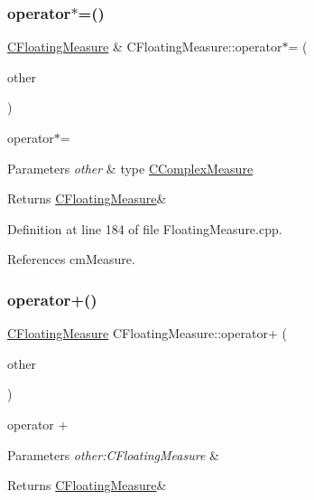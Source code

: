 \subsubsection{\texorpdfstring{operator$\ast$=()}{operator*=()}\hspace{0.1cm}{\footnotesize\ttfamily [3/3]}}
{\footnotesize\ttfamily \hyperlink{classCFloatingMeasure}{C\+Floating\+Measure} \& C\+Floating\+Measure\+::operator$\ast$= (\begin{DoxyParamCaption}\item[{const \hyperlink{classCComplexMeasure}{C\+Complex\+Measure} \&}]{other }\end{DoxyParamCaption})}



operator$\ast$= 


\begin{DoxyParams}{Parameters}
{\em other} & type \hyperlink{classCComplexMeasure}{C\+Complex\+Measure} \\
\hline
\end{DoxyParams}
\begin{DoxyReturn}{Returns}
\hyperlink{classCFloatingMeasure}{C\+Floating\+Measure}\& 
\end{DoxyReturn}


Definition at line 184 of file Floating\+Measure.\+cpp.



References cm\+Measure.

\mbox{\label{classCFloatingMeasure_a26560fcb587eafe8966541159eec57de}} 
\subsubsection{\texorpdfstring{operator+()}{operator+()}}
{\footnotesize\ttfamily \hyperlink{classCFloatingMeasure}{C\+Floating\+Measure} C\+Floating\+Measure\+::operator+ (\begin{DoxyParamCaption}\item[{const \hyperlink{classCFloatingMeasure}{C\+Floating\+Measure} \&}]{other }\end{DoxyParamCaption})}



operator + 


\begin{DoxyParams}{Parameters}
{\em other\+:\+C\+Floating\+Measure} & \\
\hline
\end{DoxyParams}
\begin{DoxyReturn}{Returns}
\hyperlink{classCFloatingMeasure}{C\+Floating\+Measure}\& 
\end{DoxyReturn}


